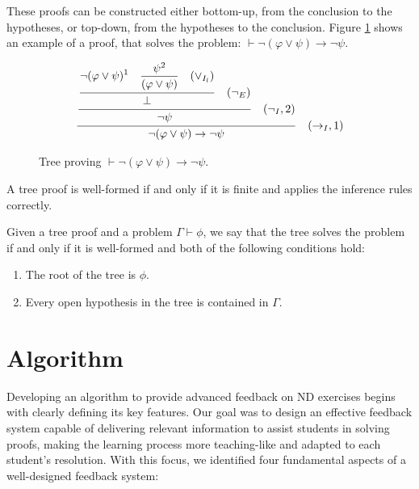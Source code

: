 \documentclass[runningheads]{llncs}
\begin{document}
These proofs can be constructed either bottom-up, from the conclusion to the hypotheses, or top-down, from the hypotheses to the conclusion. Figure \ref{tab:proof-tree} shows an example of a proof, that solves the problem: \( \vdash \neg (\varphi \lor \psi) \to \neg \psi \).

\begin{figure}
    \centering
    \[
    \frac{\displaystyle \frac{\displaystyle \frac{
    \displaystyle \neg (\varphi \lor \psi)^1 \quad \displaystyle \frac{\psi^2}{(\varphi \lor \psi) \strut} \quad (\lor_{I_l}) \strut}
    {\displaystyle \bot \strut} \quad (\displaystyle \neg_E)\strut} {\displaystyle \neg \psi \strut} \quad (\neg_I, 2) \strut}
    {\neg (\varphi \lor \psi) \to \neg \psi \strut} \quad (\to_I, 1)
    \]
    \caption{Tree proving \( \vdash \neg (\varphi \lor \psi) \to \neg \psi \).}
    \label{tab:proof-tree}
\end{figure}


\begin{definition}
A tree proof is well-formed if and only if it is finite and applies the inference rules correctly.
\end{definition}

\begin{definition}
Given a tree proof and a problem \(\Gamma \vdash \phi\), we say that the tree solves the problem if and only if it is well-formed and both of the following conditions hold:
\begin{enumerate}
    \item The root of the tree is \(\phi\).
    \item Every open hypothesis in the tree is contained in \(\Gamma\).
\end{enumerate}
\end{definition}

\section{Algorithm}
Developing an algorithm to provide advanced feedback on ND exercises begins with clearly defining its key features. Our goal was to design an effective feedback system capable of delivering relevant information to assist students in solving proofs, making the learning process more teaching-like and adapted to each student’s resolution. With this focus, we identified four fundamental aspects of a well-designed feedback system:
\end{document}
